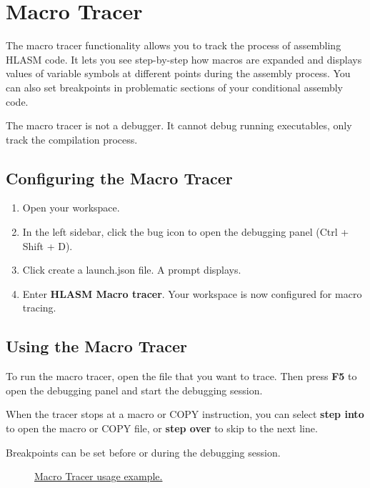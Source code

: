 \chapter{Macro Tracer}
The macro tracer functionality allows you to track the process of assembling HLASM code. It lets you see step-by-step how macros are expanded and displays values of variable symbols at different points during the assembly process. You can also set breakpoints in problematic sections of your conditional assembly code. 

The macro tracer is not a debugger. It cannot debug running executables, only track the compilation process.

\section{Configuring the Macro Tracer}

\begin{enumerate}
	\item Open your workspace.
	\item In the left sidebar, click the bug icon to open the debugging panel (Ctrl + Shift + D).
	\item Click create a launch.json file. A  prompt displays.
	\item Enter \textbf{HLASM Macro tracer}. Your workspace is now configured for macro tracing.
\end{enumerate}

\section{Using the Macro Tracer}

To run the macro tracer, open the file that you want to trace. Then press \textbf{F5} to open the debugging panel and start the debugging session.

When the tracer stops at a macro or COPY instruction, you can select \textbf{step into} to open the macro or COPY file, or \textbf{step over} to skip to the next line.

Breakpoints can be set before or during the debugging session.

\begin{figure}[H]
	\centering
	\caption{\href{https://github.com/eclipse/che-che4z-lsp-for-hlasm/blob/master/readme\_res/tracer.gif}{Macro Tracer usage example.}}
\end{figure}